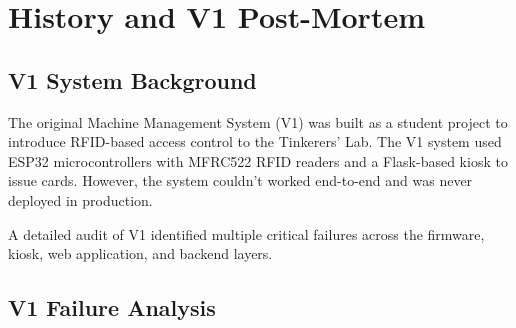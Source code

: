 \chapter{History and V1 Post-Mortem}
\label{ch:history}

\section{V1 System Background}

The original Machine Management System (V1) was built as a student project to introduce RFID-based access control to the Tinkerers' Lab. The V1 system used ESP32 microcontrollers with MFRC522 RFID readers and a Flask-based kiosk to issue cards. However, the system couldn't worked end-to-end and was never deployed in production.

A detailed audit of V1 identified multiple critical failures across the firmware, kiosk, web application, and backend layers.

\section{V1 Failure Analysis}

